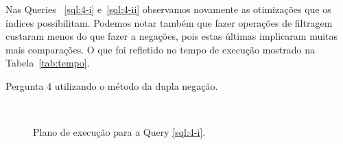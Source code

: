 \documentclass[a4paper,12pt]{article}
\begin{document}
Nas Queries ~\ref{sql:4-i} e~\ref{sql:4-ii} observamos novamente as otimizações que
os índices possibilitam. Podemos notar também que fazer operações de filtragem custaram
menos do que fazer a negações, pois estas últimas implicaram muitas mais comparações.
O que foi refletido no tempo de execução mostrado na Tabela~\ref{tab:tempo}.

\begin{program}
   
   \caption{Pergunta 4 utilizando o método da dupla negação.}
   \label{sql:4-i}
\end{program}

\begin{figure}[hpt]
   \begin{center}
      \\
   \end{center}
   \caption{Plano de execução para a Query \ref{sql:4-i}.}
   \label{fig:plano_4-i}
\end{figure}
\end{document}

